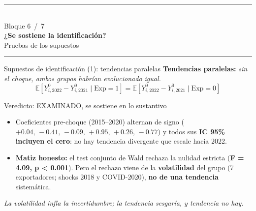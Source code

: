 \documentclass[aspectratio=169,10pt]{beamer}
\newcommand{\key}[1]{{\bfseries\color{AcentoRojo}#1}}
\newcommand{\divisor}[3]{%
  {\setbeamertemplate{footline}{}%
   \begin{frame}[plain]
     \vfill
     \begin{center}
       {\color{AcentoRojo}\rule{2.6cm}{1.2pt}}\\[0.7em]
       {\scriptsize\color{GrisMedio}Bloque #1 \,/\, 7}\\[0.6em]
       {\Large\color{Carbon}\bfseries #2}\\[0.45em]
       {\color{GrisMedio}#3}\\[0.7em]
       {\color{AcentoRojo}\rule{2.6cm}{1.2pt}}
     \end{center}
     \vfill
   \end{frame}}}
\begin{document}
\divisor{6}{¿Se sostiene la identificación?}{Pruebas de los supuestos}

\begin{frame}{Supuestos de identificación (1): tendencias paralelas}
  \footnotesize
  \textbf{Tendencias paralelas:} \emph{sin el choque, ambos grupos habrían evolucionado igual.}
  \[
    \mathbb{E}[Y^0_{i,2022}-Y^0_{i,2021}\mid \text{Exp}{=}1]
    = \mathbb{E}[Y^0_{i,2022}-Y^0_{i,2021}\mid \text{Exp}{=}0]
  \]
  \begin{block}{Veredicto: EXAMINADO, se sostiene en lo sustantivo}
    \begin{itemize}
      \item Coeficientes pre-choque (2015--2020) alternan de signo
            ($+0.04,\,-0.41,\,-0.09,\,+0.95,\,+0.26,\,-0.77$) y todos sus \textbf{IC 95\% incluyen el cero}:
            no hay tendencia divergente que escale hacia 2022.
      \item \textbf{Matiz honesto:} el test conjunto de Wald \alert{rechaza} la nulidad estricta
            (\key{F = 4.09, p < 0.001}). Pero el rechazo viene de la \textbf{volatilidad} del grupo
            (7 exportadores; shocks 2018 y COVID-2020), \textbf{no de una tendencia} sistemática.
    \end{itemize}
  \end{block}
  \centering\itshape\color{GrisMedio}
  La volatilidad infla la incertidumbre; la tendencia sesgaría, y tendencia no hay.

\end{frame}
\end{document}
